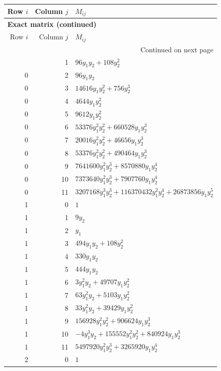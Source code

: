 \documentclass[10pt,a4paper]{article}
\begin{document}
{\small\setlength{\tabcolsep}{7pt}\begin{longtable}{rrp{125mm}}
\toprule Row $i$ & Column $j$ & $M_{ij}$\\\midrule\endfirsthead
\multicolumn{3}{l}{\textbf{Exact matrix (continued)}}\\
\toprule Row $i$ & Column $j$ & $M_{ij}$\\\midrule\endhead
\midrule\multicolumn{3}{r}{Continued on next page}\\\endfoot\bottomrule\endlastfoot
0 & 1 & $96 y_{1} y_{2} + 108 y_{2}^{2}$\\
0 & 2 & $96 y_{1} y_{2}$\\
0 & 3 & $14616 y_{1} y_{2}^{2} + 756 y_{2}^{3}$\\
0 & 4 & $4644 y_{1} y_{2}^{2}$\\
0 & 5 & $9612 y_{1} y_{2}^{2}$\\
0 & 6 & $53376 y_{1}^{2} y_{2}^{2} + 660528 y_{1} y_{2}^{3}$\\
0 & 7 & $20016 y_{1}^{2} y_{2}^{2} + 46656 y_{1} y_{2}^{3}$\\
0 & 8 & $53376 y_{1}^{2} y_{2}^{2} + 490464 y_{1} y_{2}^{3}$\\
0 & 9 & $7641600 y_{1}^{2} y_{2}^{3} + 8570880 y_{1} y_{2}^{4}$\\
0 & 10 & $7373640 y_{1}^{2} y_{2}^{3} + 7907760 y_{1} y_{2}^{4}$\\
0 & 11 & $3207168 y_{1}^{3} y_{2}^{3} + 116370432 y_{1}^{2} y_{2}^{4} + 26873856 y_{1} y_{2}^{5}$\\
1 & 0 & $1$\\
1 & 1 & $9 y_{2}$\\
1 & 2 & $y_{1}$\\
1 & 3 & $494 y_{1} y_{2} + 108 y_{2}^{2}$\\
1 & 4 & $330 y_{1} y_{2}$\\
1 & 5 & $444 y_{1} y_{2}$\\
1 & 6 & $3 y_{1}^{2} y_{2} + 49707 y_{1} y_{2}^{2}$\\
1 & 7 & $63 y_{1}^{2} y_{2} + 5103 y_{1} y_{2}^{2}$\\
1 & 8 & $33 y_{1}^{2} y_{2} + 39429 y_{1} y_{2}^{2}$\\
1 & 9 & $156928 y_{1}^{2} y_{2}^{2} + 906624 y_{1} y_{2}^{3}$\\
1 & 10 & $- 4 y_{1}^{3} y_{2} + 155552 y_{1}^{2} y_{2}^{2} + 840924 y_{1} y_{2}^{3}$\\
1 & 11 & $5497920 y_{1}^{2} y_{2}^{3} + 3265920 y_{1} y_{2}^{4}$\\
2 & 0 & $1$\\

\end{longtable}}
\end{document}
